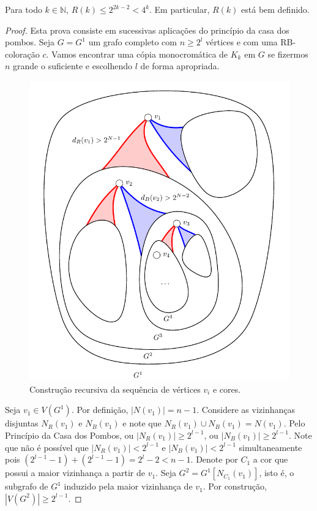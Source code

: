 \begin{theorem}[Ramsey 1930]
\label{thm:intro:ramsey}
Para todo $k \in \mathbb{N}$, $R(k) \leq 2^{2k-2} < 4^k $. Em particular, $R(k)$ está bem definido.
\end{theorem}
\begin{proof}
Esta prova consiste em sucessivas aplicações do princípio da casa dos pombos. Seja $G = G^1$ um grafo completo com $n \geq 2^{l}$ vértices e com uma RB-coloração $c$. Vamos encontrar uma cópia monocromática de $K_k$ em $G$ se fizermos $n$ grande o suficiente e escolhendo $l$ de forma apropriada.

\begin{figure}[ht!]
\centering
\includegraphics[width=0.75\linewidth]{figures/1_intro_6_recursive}
\caption{Construção recursiva da sequência de vértices $v_i$ e cores.}
\label{fig:intro:recursive}
\end{figure}

Seja $v_1 \in V(G^1)$. Por definição, $|N(v_1)| = n-1$. Considere as vizinhanças disjuntas $N_R(v_1)$ e $N_B(v_1)$ e note que $N_R(v_1) \cup N_B(v_1) = N(v_1)$. Pelo Princípio da Casa dos Pombos, ou $|N_R(v_1)| \geq 2^{l-1}$, ou $|N_B(v_1)| \geq 2^{l-1}$.
Note que não é possível que $|N_R(v_1)| < 2^{l-1}$ e $|N_B(v_1)| < 2^{l-1}$ simultaneamente pois $(2^{l-1} - 1) + (2^{l-1} - 1)  = 2^l - 2 < n - 1$.
Denote por $C_1$ a cor que possui a maior vizinhança a partir de $v_1$. Seja $G^2 = G^1[N_{C_1}(v_1)]$, isto é, o subgrafo de $G^1$ induzido pela maior vizinhança de $v_1$. Por construção, $|V(G^2)| \geq 2^{l - 1}$.


\end{proof}
